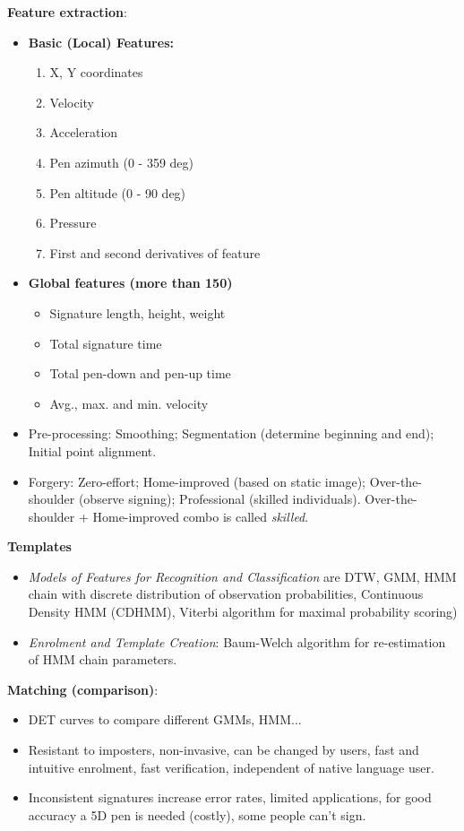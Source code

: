 \documentclass[a4paper]{article}
\begin{document}
      \textbf{Feature extraction}:
      \begin{itemize}
        \item \textbf{Basic (Local) Features:}
        \begin{enumerate}
          \item X, Y coordinates
          \item Velocity
          \item Acceleration
          \item Pen azimuth (0 - 359 deg)
          \item Pen altitude (0 - 90 deg)
          \item Pressure
          \item First and second derivatives of feature
        \end{enumerate}
        \item \textbf{Global features (more than 150)}
        \begin{itemize}
          \item Signature length, height, weight
          \item Total signature time
          \item Total pen-down and pen-up time
          \item Avg., max. and min. velocity
        \end{itemize}
        \item Pre-processing: Smoothing; Segmentation (determine beginning and end); Initial point alignment.
        \item Forgery: Zero-effort; Home-improved (based on static image); Over-the-shoulder (observe signing); Professional (skilled individuals). Over-the-shoulder + Home-improved combo is called \emph{skilled}.
      \end{itemize}

      \textbf{Templates}
      \begin{itemize}
        \item \emph{Models of Features for Recognition and Classification} are DTW, GMM, HMM chain with discrete distribution of observation probabilities, Continuous Density HMM (CDHMM), Viterbi algorithm for maximal probability scoring)
        \item \emph{Enrolment and Template Creation}: Baum-Welch algorithm for re-estimation of HMM chain parameters.
      \end{itemize}

      \textbf{Matching (comparison)}:
      \begin{itemize}
        \item DET curves to compare different GMMs, HMM...
        \item Resistant to imposters, non-invasive, can be changed by users, fast and intuitive enrolment, fast verification, independent of native language user.
        \item Inconsistent signatures increase error rates, limited applications, for good accuracy a 5D pen is needed (costly), some people can't sign.
      \end{itemize}
\end{document}
